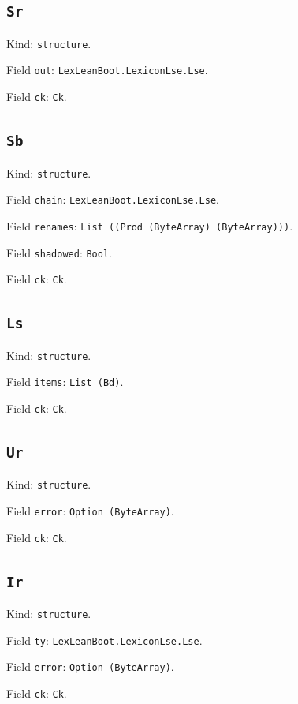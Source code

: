 \documentclass[11pt]{article}
\begin{document}
\subsection*{\texttt{Sr}}
\noindent Kind: \texttt{structure}.\par
\noindent Field \texttt{out}: \texttt{LexLeanBoot.LexiconLse.Lse}.\par
\noindent Field \texttt{ck}: \texttt{Ck}.\par
\subsection*{\texttt{Sb}}
\noindent Kind: \texttt{structure}.\par
\noindent Field \texttt{chain}: \texttt{LexLeanBoot.LexiconLse.Lse}.\par
\noindent Field \texttt{renames}: \texttt{List ((Prod (ByteArray) (ByteArray)))}.\par
\noindent Field \texttt{shadowed}: \texttt{Bool}.\par
\noindent Field \texttt{ck}: \texttt{Ck}.\par
\subsection*{\texttt{Ls}}
\noindent Kind: \texttt{structure}.\par
\noindent Field \texttt{items}: \texttt{List (Bd)}.\par
\noindent Field \texttt{ck}: \texttt{Ck}.\par
\subsection*{\texttt{Ur}}
\noindent Kind: \texttt{structure}.\par
\noindent Field \texttt{error}: \texttt{Option (ByteArray)}.\par
\noindent Field \texttt{ck}: \texttt{Ck}.\par
\subsection*{\texttt{Ir}}
\noindent Kind: \texttt{structure}.\par
\noindent Field \texttt{ty}: \texttt{LexLeanBoot.LexiconLse.Lse}.\par
\noindent Field \texttt{error}: \texttt{Option (ByteArray)}.\par
\noindent Field \texttt{ck}: \texttt{Ck}.\par
\end{document}
